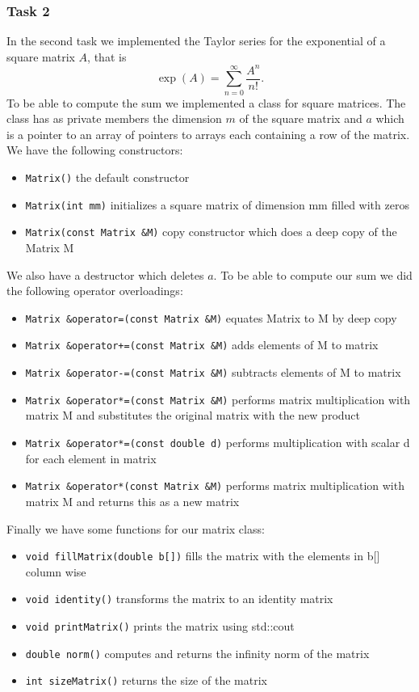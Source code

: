 \documentclass[a4paper,10pt]{article}
\begin{document}
\subsubsection*{Task 2}
In the second task we implemented the Taylor series for 
the exponential of a square matrix $A$, that is 
\begin{equation*}
  \exp(A) = \sum_{n=0}^\infty \frac{A^{n}}{n!}.
\end{equation*}
To be able to compute the sum we implemented a class for square matrices. The class has as private members the dimension $m$ of the square matrix and $a$ which is a pointer to an array of pointers to arrays each containing a row of the matrix. 
We have the following constructors:
\begin{itemize}
  \item \texttt{Matrix()} the default constructor
  \item \texttt{Matrix(int mm)} initializes a square matrix of dimension mm filled with zeros
  \item \texttt{Matrix(const Matrix \&M)} copy constructor which does a deep copy of the Matrix M
\end{itemize}
We also have a destructor which deletes $a$.
To be able to compute our sum we did the following operator overloadings: 
\begin{itemize}
  \item \texttt{Matrix \&operator=(const Matrix \&M)} equates Matrix to M by deep copy
  \item \texttt{Matrix \&operator+=(const Matrix \&M)} adds elements of M to matrix
  \item \texttt{Matrix \&operator-=(const Matrix \&M)} subtracts elements of M to matrix
  \item \texttt{Matrix \&operator*=(const Matrix \&M)} performs matrix multiplication with matrix M and substitutes the original matrix with the new product
  \item \texttt{Matrix \&operator*=(const double d)} performs 
    multiplication with scalar d for each element in matrix
  \item \texttt{Matrix \&operator*(const Matrix \&M)} performs matrix multiplication with matrix M and returns this as a new matrix
\end{itemize}
Finally we have some functions for our matrix class:
\begin{itemize}
  \item \texttt{void fillMatrix(double b[])} fills the matrix with the elements in b[] column wise
  \item \texttt{void identity()} transforms the matrix to an identity matrix
  \item \texttt{void printMatrix()} prints the matrix using std::cout
  \item \texttt{double norm()} computes and returns the infinity norm of the matrix
  \item \texttt{int sizeMatrix()} returns the size of the matrix
\end{itemize}
\end{document}
